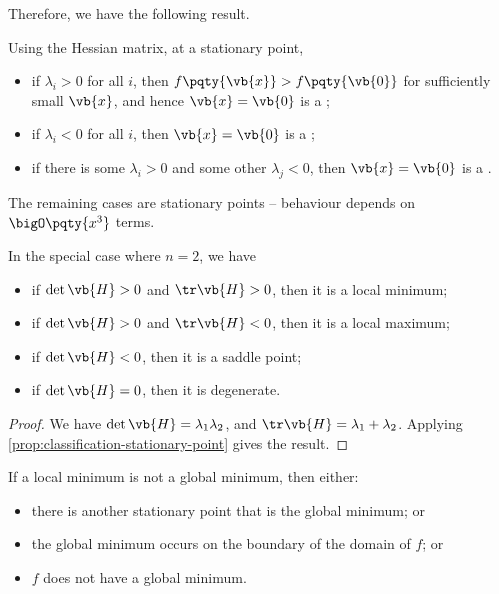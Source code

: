 Therefore, we have the following result.

\begin{proposition}
    \label{prop:classification-stationary-point}%
    Using the Hessian matrix, at a stationary point,
    \begin{itemize}
        \item if \(\lambda_i > 0\) for all \(i\), then \(f\pqty{\vb{x}} > f\pqty{\vb{0}}\) for sufficiently small \(\vb{x}\), and hence \(\vb{x} = \vb{0}\) is a ;
        \item if \(\lambda_i < 0\) for all \(i\), then \(\vb{x} = \vb{0}\) is a ;
        \item if there is some \(\lambda_i > 0\) and some other \(\lambda_j < 0\), then \(\vb{x} = \vb{0}\) is a .
    \end{itemize}
\end{proposition}

\begin{remark}
    The remaining cases are  stationary points -- behaviour depends on \(\bigO\pqty{x^3}\) terms.
\end{remark}

\begin{corollary}
    \label{cor:hessian-2-d}%
    In the special case where \(n = 2\), we have
    \begin{itemize}
        \item if \(\det \vb{H} > 0\) and \(\tr \vb{H} > 0\), then it is a local minimum;
        \item if \(\det \vb{H} > 0\) and \(\tr \vb{H} < 0\), then it is a local maximum;
        \item if \(\det \vb{H} < 0\), then it is a saddle point;
        \item if \(\det \vb{H} = 0\), then it is degenerate.
    \end{itemize}
\end{corollary}

\begin{proof}
    We have \(\det \vb{H} = \lambda_1 \lambda_2\), and \(\tr \vb{H} = \lambda_1 + \lambda_2\). Applying \autoref{prop:classification-stationary-point} gives the result.
\end{proof}

\begin{remark}
    If a local minimum is not a global minimum, then either:
    \begin{itemize}
        \item there is another stationary point that is the global minimum; or
        \item the global minimum occurs on the boundary of the domain of \(f\); or
        \item \(f\) does not have a global minimum.
    \end{itemize}
\end{remark}

